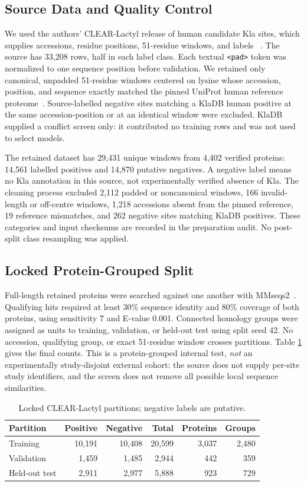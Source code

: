 \documentclass[twocolumn]{article}
\begin{document}
\subsection{Source Data and Quality Control}\label{sec:data}
We used the authors' CLEAR-Lactyl release of human candidate Kla sites,
which supplies accessions, residue positions, 51-residue windows, and labels
~\cite{li2026clear}. The source has 33,208 rows, half in each label class.
Each textual \texttt{<pad>} token was normalized to one sequence position
before validation. We retained only canonical, unpadded 51-residue windows
centered on lysine whose accession, position, and sequence exactly matched
the pinned UniProt human reference proteome~\cite{uniprot2025}. Source-labelled negative sites
matching a KlaDB human positive at the same accession-position or at an
identical window were excluded. KlaDB supplied a conflict screen only: it
contributed no training rows and was not used to select models.

The retained dataset has 29,431 unique windows from 4,402 verified proteins:
14,561 labelled positives and 14,870 putative negatives. A negative label
means no Kla annotation in this source, not experimentally verified absence
of Kla. The cleaning process excluded 2,112 padded or noncanonical windows,
166 invalid-length or off-centre windows, 1,218 accessions absent from the
pinned reference, 19 reference mismatches, and 262 negative sites matching
KlaDB positives. These categories and input checksums are recorded in the
preparation audit. No post-split class resampling was applied.

\subsection{Locked Protein-Grouped Split}
Full-length retained proteins were searched against one another with
MMseqs2~\cite{steinegger2017mmseqs2}.
Qualifying hits required at least 30\% sequence identity and 80\% coverage
of both proteins, using sensitivity 7 and E-value 0.001. Connected homology
groups were assigned as units to
training, validation, or held-out test using split seed 42. No accession,
qualifying group, or exact 51-residue window crosses partitions. Table
\ref{tab:split} gives the final counts. This is a protein-grouped internal
test, \emph{not} an experimentally study-disjoint external cohort: the source
does not supply per-site study identifiers, and the screen does not remove
all possible local sequence similarities.
\begin{table}[t]
\centering
\caption{Locked CLEAR-Lactyl partitions; negative labels are putative.}
\label{tab:split}
\begin{tabular}{lrrrrr}\toprule
Partition & Positive & Negative & Total & Proteins & Groups\\\midrule
Training & 10,191 & 10,408 & 20,599 & 3,037 & 2,480\\
Validation & 1,459 & 1,485 & 2,944 & 442 & 359\\
Held-out test & 2,911 & 2,977 & 5,888 & 923 & 729\\\bottomrule
\end{tabular}
\end{table}
\end{document}
